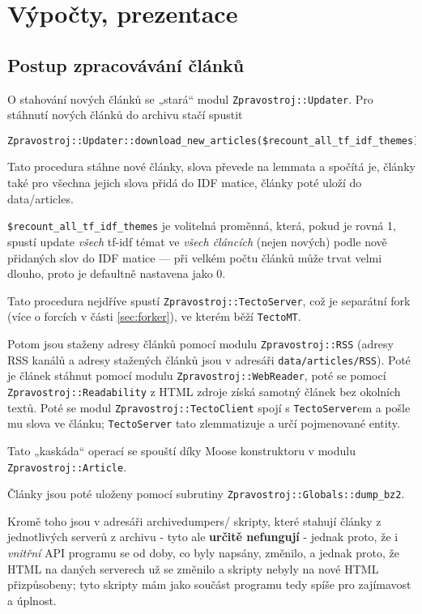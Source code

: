 \documentclass[12pt,a4paper]{report}
\def\uv#1{„#1“}
\begin{document}
\section{Výpočty, prezentace}
\subsection{Postup zpracovávání článků}

O stahování nových článků se \uv{stará} modul \texttt{Zpravostroj::Updater}. Pro stáhnutí nových článků do archivu stačí spustit 
\begin{lstlisting}
Zpravostroj::Updater::download_new_articles($recount_all_tf_idf_themes)
\end{lstlisting}

Tato procedura stáhne nové články, slova převede na lemmata a spočítá je, články také pro všechna jejich slova přidá do IDF matice, články poté uloží do data/articles.

\texttt{\$recount\_all\_tf\_idf\_themes} je volitelná proměnná, která, pokud je rovná 1, spustí update \emph{všech} tf-idf témat ve \emph{všech článcích} (nejen nových) podle nově přidaných slov do IDF matice --- při velkém počtu článků může trvat velmi dlouho, proto je defaultně nastavena jako 0.

Tato procedura nejdříve spustí \texttt{Zpravostroj::TectoServer}, což je separátní fork (více o forcích v části \ref{sec:forker}), ve kterém běží \texttt{TectoMT}.


Potom jsou staženy adresy článků pomocí modulu \texttt{Zpravostroj::RSS} (adresy RSS kanálů a adresy stažených článků jsou v adresáři \texttt{data/articles/RSS}). Poté je článek stáhnut pomocí modulu \texttt{Zpravostroj::WebReader}, poté se pomocí \texttt{Zpravostroj::Readability} z HTML zdroje získá samotný článek bez okolních textů. Poté se modul \texttt{Zpravostroj::TectoClient} spojí s \texttt{TectoServer}em a pošle mu slova ve článku; \texttt{TectoServer} tato zlemmatizuje a určí pojmenované entity.

Tato \uv{kaskáda} operací se spouští díky Moose konstruktoru v modulu \texttt{Zpravostroj::Article}.

Články jsou poté uloženy pomocí subrutiny \texttt{Zpravostroj::Globals::dump\_bz2}.

Kromě toho jsou v adresáři archivedumpers/ skripty, které stahují články z jednotlivých serverů z archivu - tyto ale \textbf{určitě nefungují} - jednak proto, že i \emph{vnitřní} API programu se od doby, co byly napsány, změnilo, a jednak proto, že HTML na daných serverech už se změnilo a skripty nebyly na nové HTML přizpůsobeny; tyto skripty mám jako součást programu tedy spíše pro zajímavost a úplnost.
\end{document}
